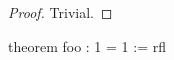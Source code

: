 \begin{leanproof}[decl=foo]
\begin{proof} Trivial. \end{proof}
\begin{leancode}
theorem foo : 1 = 1 := rfl
\end{leancode}
\end{leanproof}
